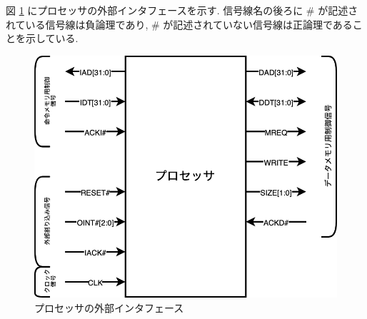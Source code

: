 \documentclass[../specifications.tex]{subfiles}
\begin{document}
  図 \ref{fig:external-interface} にプロセッサの外部インタフェースを示す.
  信号線名の後ろに \# が記述されている信号線は負論理であり, 
  \# が記述されていない信号線は正論理であることを示している.

  \begin{figure}
    \includegraphics[scale=1.5, bb=-55 0 50 100]{../../images/external_interface.png}
    \caption{プロセッサの外部インタフェース}
    \label{fig:external-interface}
  \end{figure}
\end{document}
